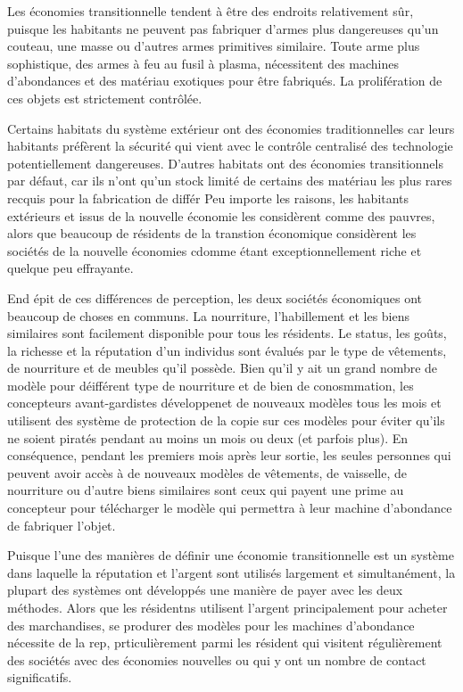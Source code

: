                Les économies transitionnelle tendent à être des endroits relativement sûr, puisque les habitants ne peuvent pas fabriquer d'armes plus dangereuses qu'un couteau, une masse ou d'autres armes primitives similaire. Toute arme plus sophistique, des armes à feu au fusil à plasma, nécessitent des machines d'abondances et des matériau exotiques pour être fabriqués. La prolifération de ces objets est strictement contrôlée. 

               Certains habitats du système extérieur ont des économies traditionnelles car leurs habitants préfèrent la sécurité qui vient avec le contrôle centralisé des technologie potentiellement dangereuses. D'autres habitats ont des économies transitionnels par défaut, car ils n'ont qu'un stock limité de certains des matériau les plus rares recquis pour la fabrication de différ Peu importe les raisons, les habitants extérieurs et issus de la nouvelle économie les considèrent comme des pauvres, alors que beaucoup de résidents de la transtion économique considèrent les sociétés de la nouvelle économies cdomme étant exceptionnellement riche et quelque peu effrayante. 

               End épit de ces différences de perception, les deux sociétés économiques ont beaucoup de choses en communs. La nourriture, l'habillement et les biens similaires sont facilement disponible pour tous les résidents. Le status, les goûts, la richesse et la réputation d'un individus sont évalués par le type de vêtements, de nourriture et de meubles qu'il possède. Bien qu'il y ait un grand nombre de modèle pour déifférent type de nourriture et de bien de conosmmation, les concepteurs avant-gardistes développenet de nouveaux modèles tous les mois et utilisent des système de protection de la copie sur ces modèles pour éviter qu'ils ne soient piratés pendant au moins un mois ou deux (et parfois plus). En conséquence, pendant les premiers mois après leur sortie, les seules personnes qui peuvent avoir accès à de nouveaux modèles de vêtements, de vaisselle, de nourriture ou d'autre biens similaires sont ceux qui payent une prime au concepteur pour télécharger le modèle qui permettra à leur machine d'abondance de fabriquer l'objet. 

               Puisque l'une des manières de définir une économie transitionnelle est un système dans laquelle la réputation et l'argent sont utilisés largement et simultanément, la plupart des systèmes ont développés une manière de payer avec les deux méthodes. Alors que les résidentns utilisent l'argent principalement pour acheter des marchandises, se produrer des modèles pour les machines d'abondance nécessite de la rep, prticulièrement parmi les résident qui visitent régulièrement des sociétés avec des économies nouvelles ou qui y ont un nombre de contact significatifs. 

